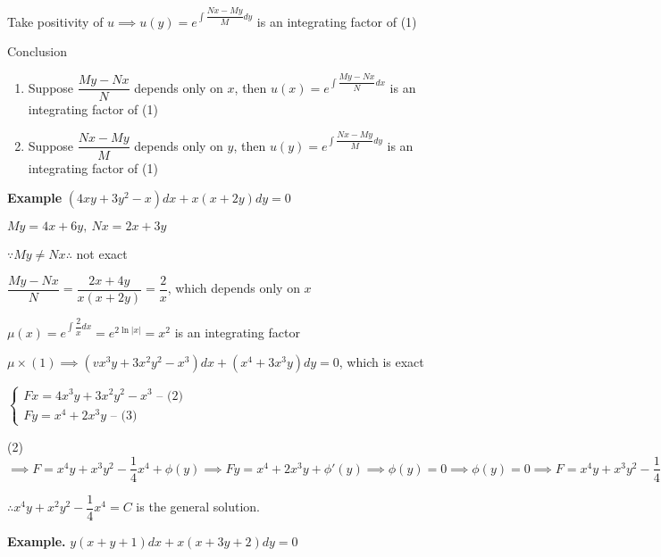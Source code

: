 Take positivity of $u \implies u(y) = e^{\int \dfrac{Nx - My}{M} dy}$ is an integrating factor of (1)

Conclusion

\begin{enumerate}
	\item Suppose $\dfrac{My - Nx}{N}$ depends only on $x$, then $u(x) = e^{\int \dfrac{My - Nx}{N}dx}$ is an integrating factor of (1)
	\item Suppose $\dfrac{Nx - My}{M}$ depends only on $y$, then $u(y) = e^{\int \dfrac{Nx - My}{M} dy}$ is an integrating factor of (1)
\end{enumerate} 

\textbf{Example} $(4xy + 3y^2 - x)dx + x(x + 2y)dy = 0$

\begin{solution}
	$My = 4x + 6y,~Nx = 2x+3y$
	
	$\because My \neq Nx \therefore$ not exact
	
	$\dfrac{My - Nx}{N} = \dfrac{2x + 4y}{x(x + 2y)} = \dfrac{2}{x}$, which depends only on $x$
	
	$\mu (x) = e^{\int \dfrac{2}{x} dx} = e^{2\ln|x|} = x^2$ is an integrating factor
	
	$\mu \times (1) \implies (vx^3y + 3x^2y^2 - x^3)dx + (x^4 + 3x^3y)dy = 0$, which is exact
	
	$\begin{cases}
		Fx = 4x^3y + 3x^2y^2 - x^3\text{ -- (2)}\\
		Fy = x^4 + 2x^3y \text{ -- (3)}
	\end{cases}$
\end{solution}

(2) $\implies F = x^4y + x^3y^2 - \dfrac{1}{4}x^4 + \phi(y) \implies Fy = x^4 + 2x^3y + \phi'(y) \implies \phi(y) = 0 \implies \phi(y) = 0 \implies F = x^4y + x^3 y^2 - \dfrac{1}{4}x^4$

$\therefore x^4 y + x^2y^2 - \dfrac{1}{4}x^4 = C$ is the general solution.

\textbf{Example.} $y(x+y+1)dx + x(x + 3y + 2)dy = 0$

